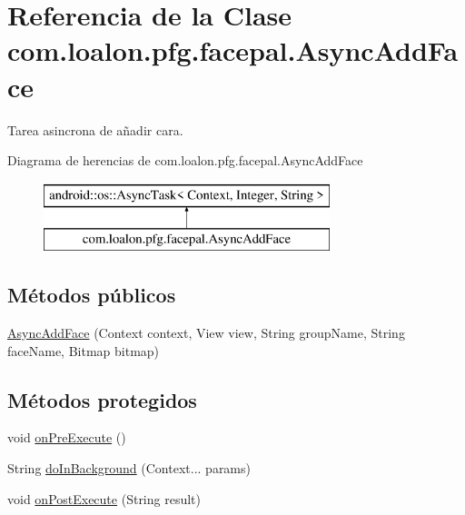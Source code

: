\hypertarget{classcom_1_1loalon_1_1pfg_1_1facepal_1_1_async_add_face}{}\section{Referencia de la Clase com.\+loalon.\+pfg.\+facepal.\+Async\+Add\+Face}
\label{classcom_1_1loalon_1_1pfg_1_1facepal_1_1_async_add_face}


Tarea asincrona de añadir cara.  


Diagrama de herencias de com.\+loalon.\+pfg.\+facepal.\+Async\+Add\+Face\begin{figure}[H]
\begin{center}
\leavevmode
\includegraphics[height=2.000000cm]{classcom_1_1loalon_1_1pfg_1_1facepal_1_1_async_add_face}
\end{center}
\end{figure}
\subsection*{Métodos públicos}
\begin{DoxyCompactItemize}
\item 
\mbox{\hyperlink{classcom_1_1loalon_1_1pfg_1_1facepal_1_1_async_add_face_a06192a655442f59a2e6e59f8467e7023}{Async\+Add\+Face}} (Context context, View view, String group\+Name, String face\+Name, Bitmap bitmap)
\end{DoxyCompactItemize}
\subsection*{Métodos protegidos}
\begin{DoxyCompactItemize}
\item 
void \mbox{\hyperlink{classcom_1_1loalon_1_1pfg_1_1facepal_1_1_async_add_face_a7429c6c8e7ccbad90ee8d9e773759eca}{on\+Pre\+Execute}} ()
\item 
String \mbox{\hyperlink{classcom_1_1loalon_1_1pfg_1_1facepal_1_1_async_add_face_aeb5252530e4cbcacbe3b9a6be3e2f0f2}{do\+In\+Background}} (Context... params)
\item 
void \mbox{\hyperlink{classcom_1_1loalon_1_1pfg_1_1facepal_1_1_async_add_face_abde1ae4ecac2cbf630715dbf1fd88d36}{on\+Post\+Execute}} (String result)
\end{DoxyCompactItemize}


